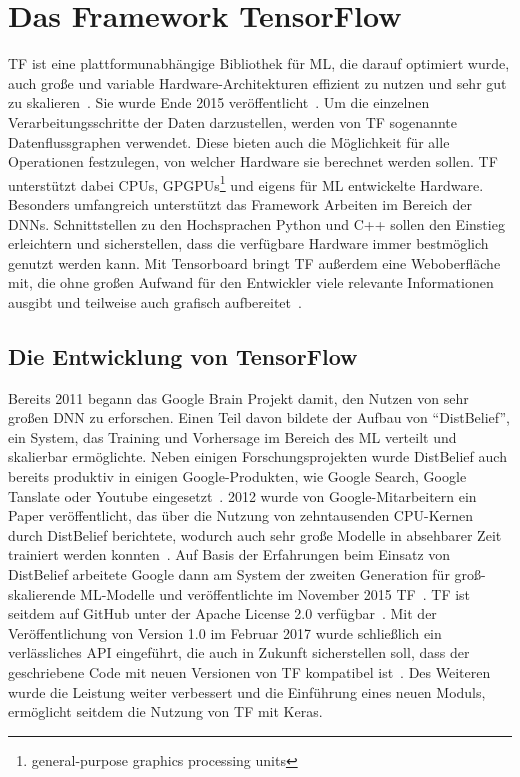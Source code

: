 \chapter{Das Framework TensorFlow}

\gls{TF} ist eine plattformunabhängige Bibliothek für \gls{ML}, die darauf optimiert wurde, auch große und variable Hardware-Architekturen effizient zu nutzen und sehr gut zu skalieren~\cite{tensorflow2015-whitepaper}. Sie wurde Ende 2015 veröffentlicht~\cite{tf-opensource}. Um die einzelnen Verarbeitungsschritte der Daten darzustellen, werden von \gls{TF} sogenannte Datenflussgraphen verwendet. Diese bieten auch die Möglichkeit für alle Operationen festzulegen, von welcher Hardware sie berechnet werden sollen. \gls{TF} unterstützt dabei CPUs, GPGPUs\footnote{general-purpose graphics processing units} und eigens für \gls{ML} entwickelte Hardware.
Besonders umfangreich unterstützt das Framework Arbeiten im Bereich der \glspl{DNN}. Schnittstellen zu den Hochsprachen Python und C++ sollen den Einstieg erleichtern und sicherstellen, dass die verfügbare Hardware immer bestmöglich genutzt werden kann. Mit Tensorboard bringt \gls{TF} außerdem eine Weboberfläche mit, die ohne großen Aufwand für den Entwickler viele relevante Informationen ausgibt und teilweise auch grafisch aufbereitet~\cite{tensorflow2016-whitepaper}.

\section{Die Entwicklung von TensorFlow}
Bereits 2011 begann das Google Brain Projekt damit, den Nutzen von sehr großen \gls{DNN} zu erforschen. Einen Teil davon bildete der Aufbau von "`DistBelief"', ein System, das Training und Vorhersage im Bereich des \gls{ML} verteilt und skalierbar ermöglichte. Neben einigen Forschungsprojekten wurde DistBelief auch bereits produktiv in einigen Google-Produkten, wie Google Search, Google Tanslate oder Youtube eingesetzt~\cite{tensorflow2016-whitepaper}. 2012 wurde von Google-Mitarbeitern ein Paper veröffentlicht, das über die Nutzung von zehntausenden CPU-Kernen  durch DistBelief berichtete, wodurch auch sehr große Modelle in absehbarer Zeit trainiert werden konnten~\cite{NIPS2012}. Auf Basis der Erfahrungen beim Einsatz von DistBelief arbeitete Google dann am System der zweiten Generation für groß-skalierende \gls{ML}-Modelle und veröffentlichte im November 2015 \gls{TF}~\cite{tf-opensource}. \gls{TF} ist seitdem auf GitHub unter der Apache License 2.0 verfügbar~\cite{tf-git}.  Mit der Veröffentlichung von Version 1.0 im Februar 2017 wurde schließlich ein verlässliches \gls{API} eingeführt, die auch in Zukunft sicherstellen soll, dass der geschriebene Code mit neuen Versionen von \gls{TF} kompatibel ist~\cite{tf1}. Des Weiteren wurde die Leistung weiter verbessert und die Einführung eines neuen Moduls, ermöglicht seitdem die Nutzung von \gls{TF} mit Keras.

